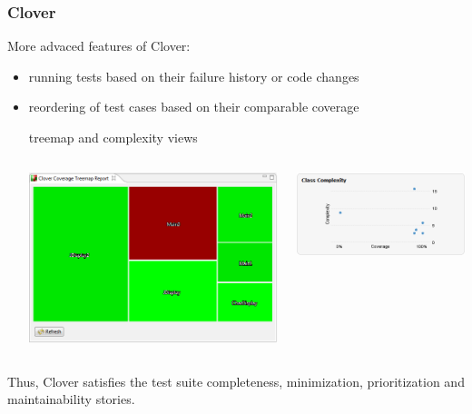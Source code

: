 \documentclass{beamer}
\begin{document}
\begin{frame}
  \frametitle{Clover}
More advaced features of Clover:
\begin{itemize}
  \item running tests based on their failure history or code changes
  \item reordering of test cases based on their comparable coverage
  \begin{item} treemap and complexity views
    \begin{columns}[T]
    \begin{column}{.5\textwidth}
         \hfill
         \includegraphics[scale=0.3]{clover_treemap.png}
    \end{column}
    \begin{column}{.6\textwidth}
       \includegraphics[scale=0.55]{clover_complexity.png}
    \end{column}
    \end{columns}
  \end{item}
\end{itemize}
Thus, Clover satisfies the test suite completeness, minimization, prioritization and maintainability stories.
\end{frame}
\end{document}
